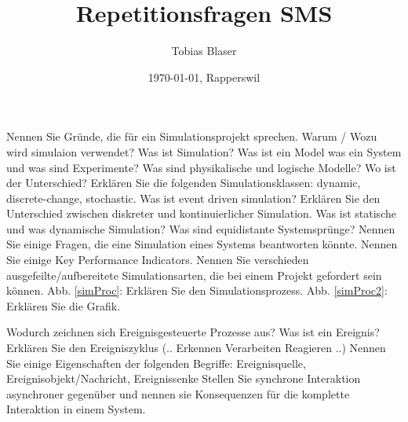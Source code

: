 \documentclass[ngerman,a4paper,12pt]{scrreprt}
\title{Repetitionsfragen SMS}
\author{Tobias Blaser}
\date{\today{}, Rapperswil}
\begin{document}
\tableofcontents
\clearpage

\ol
	\li Nennen Sie Gründe, die für ein Simulationsprojekt sprechen.
	\li Warum / Wozu wird simulaion verwendet?
	\li Was ist Simulation?
	\li Was ist ein Model was ein System und was sind Experimente?
	\li Was sind physikalische und logische Modelle? Wo ist der Unterschied?
	\li Erklären Sie die folgenden Simulationsklassen: dynamic, discrete-change, stochastic.
	\li Was ist event driven simulation?
	\li Erklären Sie den Unterschied zwischen diskreter und kontinuierlicher Simulation.
	\li Was ist statische und was dynamische Simulation?
	\li Was sind equidistante Systemsprünge?
	\li Nennen Sie einige Fragen, die eine Simulation eines Systems beantworten könnte.
	\li Nennen Sie einige Key Performance Indicators.
	\li Nennen Sie verschieden ausgefeilte/aufbereitete Simulationsarten, die bei einem Projekt gefordert sein können.
	\li Abb. \ref{simProc}: Erklären Sie den Simulationsprozess.
	\li Abb. \ref{simProc2}: Erklären Sie die Grafik.
\olS


\olR
	\li Wodurch zeichnen sich Ereignisgesteuerte Prozesse aus?
	\li Was ist ein Ereignis?
	\li Erklären Sie den Ereigniszyklus (.. \ra Erkennen \ra Verarbeiten \ra Reagieren \ra ..)
	\li Nennen Sie einige Eigenschaften der folgenden Begriffe: Ereignisquelle, Ereignisobjekt/Nachricht, Ereignissenke
	\li Stellen Sie synchrone Interaktion asynchroner gegenüber und nennen sie Konsequenzen für die komplette Interaktion in einem System.
	\li 
\olS
\end{document}

